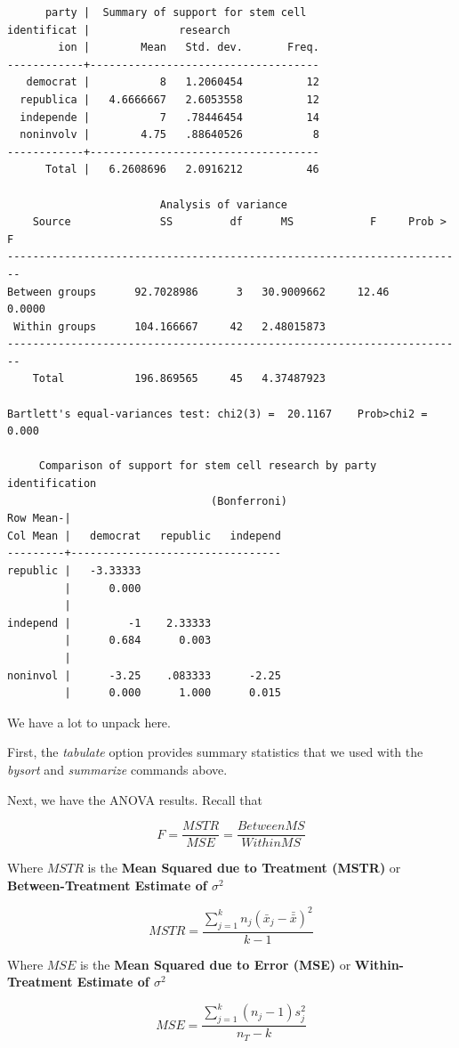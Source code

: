 \documentclass[
]{book}
\begin{document}
\begin{verbatim}
      party |  Summary of support for stem cell
identificat |              research
        ion |        Mean   Std. dev.       Freq.
------------+------------------------------------
   democrat |           8   1.2060454          12
  republica |   4.6666667   2.6053558          12
  independe |           7   .78446454          14
  noninvolv |        4.75   .88640526           8
------------+------------------------------------
      Total |   6.2608696   2.0916212          46

                        Analysis of variance
    Source              SS         df      MS            F     Prob > F
------------------------------------------------------------------------
Between groups      92.7028986      3   30.9009662     12.46     0.0000
 Within groups      104.166667     42   2.48015873
------------------------------------------------------------------------
    Total           196.869565     45   4.37487923

Bartlett's equal-variances test: chi2(3) =  20.1167    Prob>chi2 = 0.000

     Comparison of support for stem cell research by party identification
                                (Bonferroni)
Row Mean-|
Col Mean |   democrat   republic   independ
---------+---------------------------------
republic |   -3.33333
         |      0.000
         |
independ |         -1    2.33333
         |      0.684      0.003
         |
noninvol |      -3.25    .083333      -2.25
         |      0.000      1.000      0.015
\end{verbatim}

We have a lot to unpack here.

First, the \emph{tabulate} option provides summary statistics that we used with the \emph{bysort} and \emph{summarize} commands above.

Next, we have the ANOVA results. Recall that

\[ F=\frac{MSTR}{MSE} = \frac{BetweenMS}{WithinMS}\]

Where \(MSTR\) is the \textbf{Mean Squared due to Treatment (MSTR)} or \textbf{Between-Treatment Estimate of \(\sigma^2\)}

\[ MSTR = \frac{\sum^k_{j=1}n_j(\bar{x}_j - \bar{\bar{x}})^2}{k-1} \]

Where \(MSE\) is the \textbf{Mean Squared due to Error (MSE)} or \textbf{Within-Treatment Estimate of \(\sigma^2\)}

\[ MSE = \frac{\sum^k_{j=1}(n_j - 1)s^2_j }{n_T - k} \]
\end{document}
